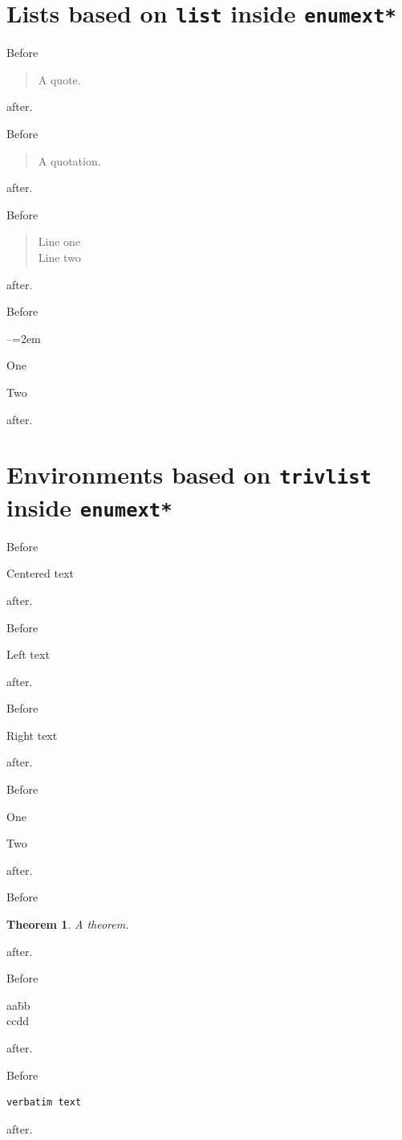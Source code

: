 \documentclass{article}
\newtheorem{thm}{Theorem}
\begin{document}
\section{Lists based on \texttt{list} inside \texttt{enumext*}}

\begin{enumext*}[columns=1,label=\arabic*.]
  \item Before \begin{quote}A quote.\end{quote} after.
  \item Before \begin{quotation}A quotation.\end{quotation} after.
  \item Before \begin{verse}Line one \\ Line two\end{verse} after.
  \item Before \begin{list}{--}{\leftmargin=2em}\item One \item Two\end{list} after.
\end{enumext*}

\section{Environments based on \texttt{trivlist} inside \texttt{enumext*}}

\begin{enumext*}[columns=1,label=\arabic*.]
  \item Before \begin{center}Centered text\end{center} after.
  \item Before \begin{flushleft}Left text\end{flushleft} after.
  \item Before \begin{flushright}Right text\end{flushright} after.
  \item Before \begin{trivlist}\item[X] One \item[Y] Two\end{trivlist} after.
  \item Before \begin{thm}A theorem.\end{thm} after.
  \item Before \begin{tabbing}aa\=bb\\cc\>dd\end{tabbing} after.
  \item Before
\begin{verbatim}
verbatim text
\end{verbatim}
  after.
\end{enumext*}
\end{document}
